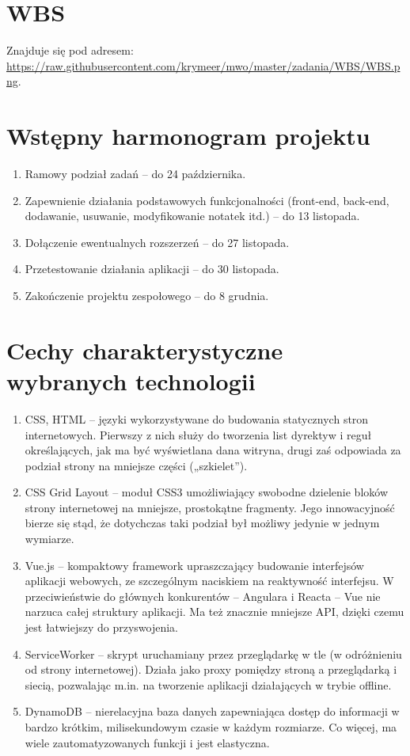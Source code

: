 \documentclass[a4paper,11pt]{article}
\begin{document}
  \section{WBS} 
  Znajduje się pod adresem:\newline
  \url{https://raw.githubusercontent.com/krymeer/mwo/master/zadania/WBS/WBS.png}.

  \section{Wstępny harmonogram projektu}
  \begin{enumerate}
    \item Ramowy podział zadań -- do 24 października. 
    \item Zapewnienie działania podstawowych funkcjonalności (front-end, back-end, dodawanie, usuwanie, modyfikowanie notatek itd.) -- do 13 listopada. 
    \item Dołączenie ewentualnych rozszerzeń -- do 27 listopada. 
    \item Przetestowanie działania aplikacji -- do 30 listopada. 
    \item Zakończenie projektu zespołowego -- do 8 grudnia.
  \end{enumerate}

  \section{Cechy charakterystyczne wybranych technologii}
  \begin{enumerate}
    \item CSS, HTML -- języki wykorzystywane do budowania statycznych stron internetowych. Pierwszy z nich służy do tworzenia list dyrektyw i reguł określających, jak ma być wyświetlana dana witryna, drugi zaś odpowiada za podział strony na mniejsze części („szkielet”). 
    \item CSS Grid Layout -- moduł CSS3 umożliwiający swobodne dzielenie bloków strony internetowej na mniejsze, prostokątne fragmenty. Jego innowacyjność bierze się stąd, że dotychczas taki podział był możliwy jedynie w jednym wymiarze. 
    \item Vue.js -- kompaktowy framework upraszczający budowanie interfejsów aplikacji webowych, ze szczególnym naciskiem na reaktywność interfejsu. W przeciwieństwie do głównych konkurentów -- Angulara i Reacta -- Vue nie narzuca całej struktury aplikacji. Ma też znacznie mniejsze API, dzięki czemu jest łatwiejszy do przyswojenia. 
    \item ServiceWorker -- skrypt uruchamiany przez przeglądarkę w tle (w odróżnieniu od strony internetowej). Działa jako proxy pomiędzy stroną a przeglądarką i siecią, pozwalając m.in. na tworzenie aplikacji działających w trybie offline. 
    \item DynamoDB -- nierelacyjna baza danych zapewniająca dostęp do informacji w bardzo krótkim, milisekundowym czasie  w każdym rozmiarze. Co więcej, ma wiele zautomatyzowanych funkcji i jest elastyczna.
  \end{enumerate}
\end{document}
